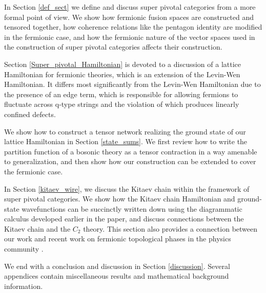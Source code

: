 In Section \ref{def_sect} we define and discuss super pivotal categories from a more formal point of view. 
We show how fermionic fusion spaces are constructed and tensored together, how 
coherence relations like the pentagon identity are modified in the fermionic case, 
and how the fermionic nature of the vector spaces used in the construction of super 
pivotal categories affects their construction. 

Section \ref{Super_pivotal_Hamiltonian} is devoted to a discussion of a lattice Hamiltonian for fermionic theories, which is an extension of the Levin-Wen Hamiltonian. 
It differs most significantly from the Levin-Wen Hamiltonian due to the presence of an edge term, which 
is responsible for allowing fermions to fluctuate across q-type strings and the violation 
of which produces linearly confined defects. 

We show how to construct a tensor network realizing the ground state of our lattice Hamiltonian 
in Section \ref{state_sums}. We first review how to write the partition function of a bosonic theory 
as a tensor contraction in a way amenable to generalization, and then show how our construction 
can be extended to cover the fermionic case. 

In Section \ref{kitaev_wire}, we discuss the Kitaev chain within the framework of super pivotal 
categories. 
We show how the Kitaev chain Hamiltonian and ground-state wavefunctions can be 
succinctly written down using the diagrammatic calculus developed earlier in the paper, and 
discuss connections between the Kitaev chain and the $C_2$ theory. 
This section also provides a connection between our work 
and recent work on fermionic topological phases in the physics community \cite{ware2016,tarantino2016,turzillo2016}. 

We end with a conclusion and discussion in Section \ref{discussion}. 
Several appendices contain miscellaneous results and mathematical background information. 


%








